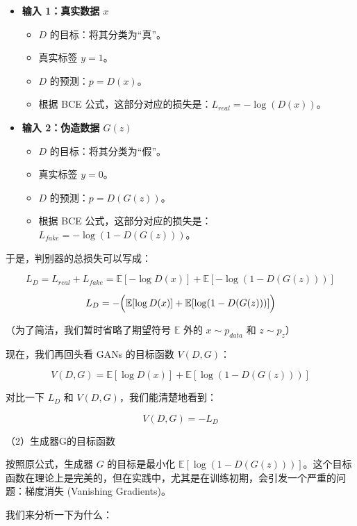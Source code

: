 \begin{itemize}
\tightlist
\item
  \textbf{输入 1：真实数据 \(x\)}

  \begin{itemize}
  \tightlist
  \item
    \(D\) 的目标：将其分类为``真''。
  \item
    真实标签 \(y=1\)。
  \item
    \(D\) 的预测：\(p=D(x)\)。
  \item
    根据 BCE 公式，这部分对应的损失是：\(L_{real}=-\log(D(x))\)。
  \end{itemize}
\item
  \textbf{输入 2：伪造数据 \(G(z)\)}

  \begin{itemize}
  \tightlist
  \item
    \(D\) 的目标：将其分类为``假''。
  \item
    真实标签 \(y=0\)。
  \item
    \(D\) 的预测：\(p=D(G(z))\)。
  \item
    根据 BCE 公式，这部分对应的损失是：\(L_{fake}=-\log(1-D(G(z)))\)。
  \end{itemize}
\end{itemize}

于是，判别器的总损失可以写成：

\[
L_D = L_{real} + L_{fake} = \mathbb{E}[-\log D(x)] + \mathbb{E}[-\log(1-D(G(z)))]
\]

\[
L_D = -\Bigl(\mathbb{E}[\log D(x)] + \mathbb{E}[\log(1-D(G(z)))]\Bigr)
\]

（为了简洁，我们暂时省略了期望符号 \(\mathbb{E}\) 外的 \(x\sim p_{data}\) 和 \(z\sim p_z\)）

现在，我们再回头看 GANs 的目标函数 \(V(D,G)\)：

\[
V(D,G)=\mathbb{E}[\log D(x)] + \mathbb{E}[\log(1-D(G(z)))]
\]

对比一下 \(L_D\) 和 \(V(D,G)\)，我们能清楚地看到：

\[
V(D,G) = -L_D
\]

（2）生成器G的目标函数

按照原公式，生成器 \(G\) 的目标是最小化 \(\mathbb{E}[\log(1-D(G(z)))]\)。这个目标函数在理论上是完美的，但在实践中，尤其是在训练初期，会引发一个严重的问题：梯度消失 (Vanishing Gradients)。

我们来分析一下为什么：

